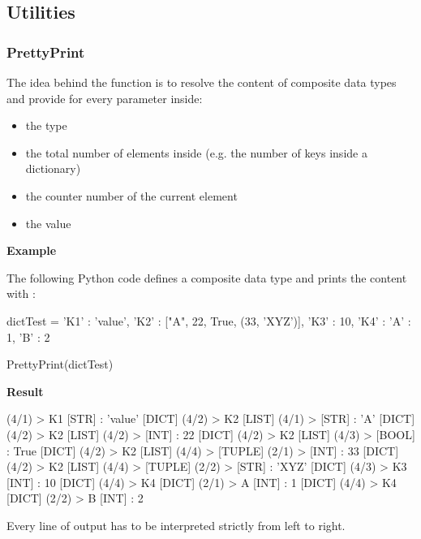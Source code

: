 \newpage

\subsection{Utilities}

\subsubsection{PrettyPrint}

The idea behind the  function is to resolve the content of composite data types and provide for every parameter inside:

\begin{itemize}
   \item the type
   \item the total number of elements inside (e.g. the number of keys inside a dictionary)
   \item the counter number of the current element
   \item the value
\end{itemize}

\textbf{Example}

The following Python code defines a composite data type and prints the content with :

\begin{pythoncode}
dictTest = {'K1' : 'value',
            'K2' : ["A", 22, True, (33, 'XYZ')],
            'K3' : 10,
            'K4' : {'A' : 1,
                    'B' : 2}}

PrettyPrint(dictTest)
\end{pythoncode}

\textbf{Result}

\begin{robotlog}
[DICT] (4/1) > {K1} [STR]  :  'value'
[DICT] (4/2) > {K2} [LIST] (4/1) > [STR]  :  'A'
[DICT] (4/2) > {K2} [LIST] (4/2) > [INT]  :  22
[DICT] (4/2) > {K2} [LIST] (4/3) > [BOOL]  :  True
[DICT] (4/2) > {K2} [LIST] (4/4) > [TUPLE] (2/1) > [INT]  :  33
[DICT] (4/2) > {K2} [LIST] (4/4) > [TUPLE] (2/2) > [STR]  :  'XYZ'
[DICT] (4/3) > {K3} [INT]  :  10
[DICT] (4/4) > {K4} [DICT] (2/1) > {A} [INT]  :  1
[DICT] (4/4) > {K4} [DICT] (2/2) > {B} [INT]  :  2
\end{robotlog}

Every line of output has to be interpreted strictly from left to right.

